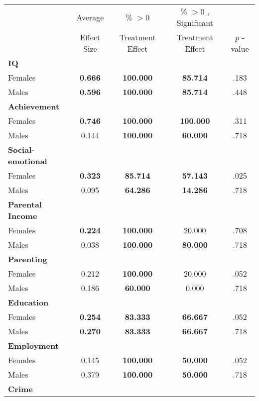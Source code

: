 \begin{tabular}{l c c c c}
\toprule
 & Average & \% $ >0 $ & \% $ >0 $ , Significant & \citet{Rosenbaum_2005_Distribution_JRSS} \\
 & Effect Size & Treatment Effect & Treatment Effect & $ p $ -value \\
\midrule
\textbf{IQ} & & & & \\
\quad Females &  \textbf{    0.666} & \textbf{  100.000} & \textbf{   85.714} & .183 \\
\quad Males &  \textbf{    0.596} & \textbf{  100.000} & \textbf{   85.714} & .448 \\
\midrule
\textbf{Achievement} & & & & \\
\quad Females &  \textbf{    0.746} & \textbf{  100.000} & \textbf{  100.000} & .311 \\
\quad Males &      0.144 & \textbf{  100.000} & \textbf{   60.000} & .718 \\
\midrule
\textbf{Social-emotional} & & & & \\
\quad Females &  \textbf{    0.323} & \textbf{   85.714} & \textbf{   57.143} & .025 \\
\quad Males &      0.095 & \textbf{   64.286} & \textbf{   14.286} & .718 \\
\midrule
\textbf{Parental Income} & & & & \\
\quad Females &  \textbf{    0.224} & \textbf{  100.000} &    20.000 & .708 \\
\quad Males &      0.038 & \textbf{  100.000} & \textbf{   80.000} & .718 \\
\midrule
\textbf{Parenting} & & & & \\
\quad Females &      0.212 & \textbf{  100.000} &    20.000 & .052 \\
\quad Males &      0.186 & \textbf{   60.000} &     0.000 & .718 \\
\midrule
\textbf{Education} & & & & \\
\quad Females &  \textbf{    0.254} & \textbf{   83.333} & \textbf{   66.667} & .052 \\
\quad Males &  \textbf{    0.270} & \textbf{   83.333} & \textbf{   66.667} & .718 \\
\midrule
\textbf{Employment} & & & & \\
\quad Females &      0.145 & \textbf{  100.000} & \textbf{   50.000} & .052 \\
\quad Males &      0.379 & \textbf{  100.000} & \textbf{   50.000} & .718 \\
\midrule
\textbf{Crime} & & & & \\

\end{tabular}
